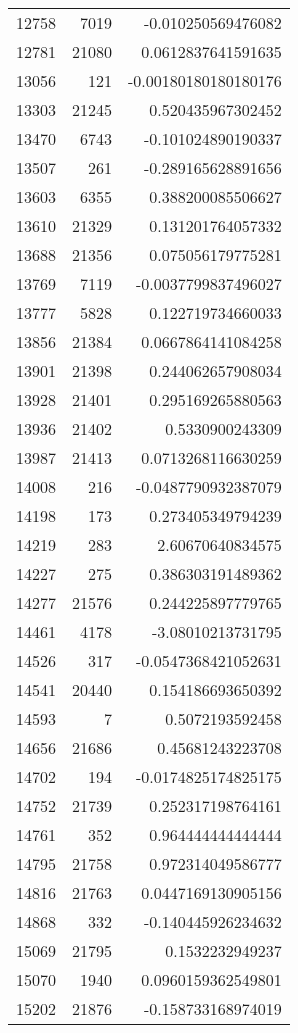\begin{tabular}{r | r | r}
12758 & 7019 & -0.010250569476082 \\
12781 & 21080 & 0.0612837641591635 \\
13056 & 121 & -0.00180180180180176 \\
13303 & 21245 & 0.520435967302452 \\
13470 & 6743 & -0.101024890190337 \\
13507 & 261 & -0.289165628891656 \\
13603 & 6355 & 0.388200085506627 \\
13610 & 21329 & 0.131201764057332 \\
13688 & 21356 & 0.075056179775281 \\
13769 & 7119 & -0.0037799837496027 \\
13777 & 5828 & 0.122719734660033 \\
13856 & 21384 & 0.0667864141084258 \\
13901 & 21398 & 0.244062657908034 \\
13928 & 21401 & 0.295169265880563 \\
13936 & 21402 & 0.5330900243309 \\
13987 & 21413 & 0.0713268116630259 \\
14008 & 216 & -0.0487790932387079 \\
14198 & 173 & 0.273405349794239 \\
14219 & 283 & 2.60670640834575 \\
14227 & 275 & 0.386303191489362 \\
14277 & 21576 & 0.244225897779765 \\
14461 & 4178 & -3.08010213731795 \\
14526 & 317 & -0.0547368421052631 \\
14541 & 20440 & 0.154186693650392 \\
14593 & 7 & 0.5072193592458 \\
14656 & 21686 & 0.45681243223708 \\
14702 & 194 & -0.0174825174825175 \\
14752 & 21739 & 0.252317198764161 \\
14761 & 352 & 0.964444444444444 \\
14795 & 21758 & 0.972314049586777 \\
14816 & 21763 & 0.0447169130905156 \\
14868 & 332 & -0.140445926234632 \\
15069 & 21795 & 0.1532232949237 \\
15070 & 1940 & 0.0960159362549801 \\
15202 & 21876 & -0.158733168974019 \\

\end{tabular}
